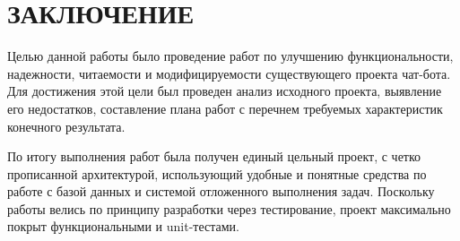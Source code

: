 \section*{ЗАКЛЮЧЕНИЕ}
Целью данной работы было проведение работ по улучшению
функциональности, надежности, читаемости и модифицируемости существующего проекта
чат-бота. Для достижения этой цели был проведен анализ исходного проекта, выявление
его недостатков, составление плана работ с перечнем требуемых характеристик конечного
результата.

По итогу выполнения работ была получен единый цельный проект, с четко прописанной архитектурой,
использующий удобные и понятные средства по работе с базой данных и
системой отложенного выполнения задач.
Поскольку работы велись по принципу разработки через тестирование, проект максимально покрыт
функциональными и unit-тестами.
